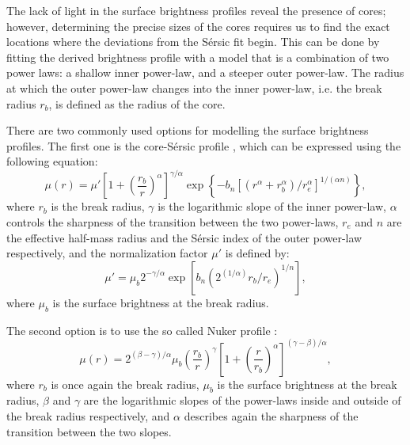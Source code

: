 \documentclass[english, oneside]{HYgradu}
\begin{document}
The lack of light in the surface brightness profiles reveal the presence of cores; however, determining the precise sizes of the cores requires us to find the exact locations where the deviations from the Sérsic fit begin. This can be done by fitting the derived brightness profile with a model that is a combination of two power laws: a shallow inner power-law, and a steeper outer power-law. The radius at which the outer power-law changes into the inner power-law, i.e. the break radius $r_b$, is defined as the radius of the core. 

There are two commonly used options for modelling the surface brightness profiles. The first one is the core-Sérsic profile \citep{Graham2003}, which can be expressed using the following equation:
\begin{equation}
\mu(r) = \mu' \left[ 1 + \left( \frac{r_b}{r} \right)^\alpha \right]^{\gamma / \alpha} \exp \left\lbrace -b_n \left[ \left( r^\alpha + r_b^\alpha \right) / r_e^\alpha \right]^{1/(\alpha n)} \right\rbrace, \label{eq:core-sersic}
\end{equation}
where $r_b$ is the break radius, $\gamma$ is the logarithmic slope of the inner power-law, $\alpha$ controls the sharpness of the transition between the two power-laws, $r_e$ and $n$ are the effective half-mass radius and the Sérsic index of the outer power-law respectively, and the normalization factor $\mu'$ is defined by:
\begin{equation}
\mu' = \mu_b 2^{-\gamma/\alpha} \exp \left[ b_n \left( 2^{(1/\alpha)} r_b/r_e \right)^{1/n} \right], 
\label{eq:mu_dot}
\end{equation}
where $\mu_b$ is the surface brightness at the break radius. 

The second option is to use the so called Nuker profile \citep{Lauer1995}:
\begin{equation}
\mu(r) = 2^{(\beta - \gamma) / \alpha} \mu_b \left( \frac{r_b}{r} \right)^\gamma \left[ 1 + \left( \frac{r}{r_b} \right)^\alpha \right]^{(\gamma - \beta)/\alpha},
\label{eq:nuker}
\end{equation}
where $r_b$ is once again the break radius, $\mu_b$ is the surface brightness at the break radius, $\beta$ and $\gamma$ are the logarithmic slopes of the power-laws inside and outside of the break radius respectively, and $\alpha$ describes again the sharpness of the transition between the two slopes.
\end{document}

